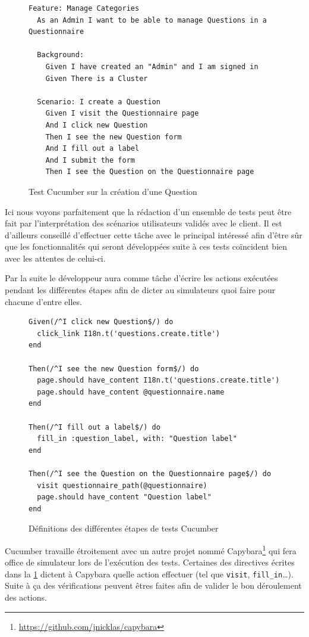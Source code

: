 \documentclass[12pt,a4paper]{book}
\begin{document}
\begin{figure}[h]
\lstset{language=ruby}
\begin{lstlisting}
Feature: Manage Categories
  As an Admin I want to be able to manage Questions in a Questionnaire

  Background:
    Given I have created an "Admin" and I am signed in
    Given There is a Cluster

  Scenario: I create a Question
    Given I visit the Questionnaire page
    And I click new Question
    Then I see the new Question form
    And I fill out a label
    And I submit the form
    Then I see the Question on the Questionnaire page
\end{lstlisting}
 \caption{Test Cucumber sur la création d'une Question}
\end{figure}

Ici nous voyons parfaitement que la rédaction d'un ensemble de tests peut être fait par l'interprétation des scénarios utilisateurs validés avec le client. Il est d'ailleurs conseillé d'effectuer cette tâche avec le principal intéressé afin d'être sûr que les fonctionnalités qui seront développées suite à ces tests coïncident bien avec les attentes de celui-ci.

Par la suite le développeur aura comme tâche d'écrire les actions exécutées pendant les différentes étapes afin de dicter au simulateurs quoi faire pour chacune d'entre elles.

\begin{figure}[h]
\lstset{language=ruby}
\begin{lstlisting}
Given(/^I click new Question$/) do
  click_link I18n.t('questions.create.title')
end

Then(/^I see the new Question form$/) do
  page.should have_content I18n.t('questions.create.title')
  page.should have_content @questionnaire.name
end

Then(/^I fill out a label$/) do
  fill_in :question_label, with: "Question label"
end

Then(/^I see the Question on the Questionnaire page$/) do
  visit questionnaire_path(@questionnaire)
  page.should have_content "Question label"
end
\end{lstlisting}
 \caption{Définitions des différentes étapes de tests Cucumber}
 \label{fig.cucumber2}
\end{figure}

Cucumber travaille étroitement avec un autre projet nommé Capybara\footnote{\url{https://github.com/jnicklas/capybara}} qui fera office de simulateur lors de l'exécution des tests. Certaines des directives écrites dans la \cref{fig.cucumber2} dictent à Capybara quelle action effectuer (tel que \texttt{visit}, \texttt{fill\_in}\dots). Suite à ça des vérifications peuvent êtres faites afin de valider le bon déroulement des actions. 
\end{document}
